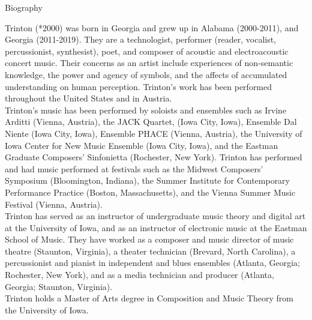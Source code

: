 \documentclass[11pt]{article}
\begin{document}
\vspace*{2\baselineskip}

\begingroup
\begin{center}
\huge Biography
\end{center}
\endgroup

\vspace*{2\baselineskip}

\begingroup
\begin{center}
Trinton (*2000) was born in Georgia and grew up in Alabama (2000-2011), and Georgia (2011-2019). They are a technologist, performer (reader, vocalist, percussionist, synthesist), poet, and composer of acoustic and electroacoustic concert music. Their concerns as an artist include experiences of non-semantic knowledge, the power and agency of symbols, and the affects of accumulated understanding on human perception. Trinton's work has been performed throughout the United States and in Austria. \\ Trinton's music has been performed by soloists and ensembles such as Irvine Arditti (Vienna, Austria), the JACK Quartet, (Iowa City, Iowa),  Ensemble Dal Niente (Iowa City, Iowa), Ensemble PHACE (Vienna, Austria), the University of Iowa Center for New Music Ensemble (Iowa City, Iowa), and the Eastman Graduate Composers' Sinfonietta (Rochester, New York). Trinton has performed and had music performed at festivals such as the Midwest Composers' Symposium (Bloomington, Indiana), the Summer Institute for Contemporary Performance Practice (Boston, Massachusetts), and the Vienna Summer Music Festival (Vienna, Austria). \\ Trinton has served as an instructor of undergraduate music theory and digital art at the University of Iowa, and as an instructor of electronic music at the Eastman School of Music. They have worked as a composer and music director of music theatre (Staunton, Virginia), a theater technician (Brevard, North Carolina), a percussionist and pianist in independent and blues ensembles (Atlanta, Georgia; Rochester, New York), and as a media technician and producer (Atlanta, Georgia; Staunton, Virginia). \\ Trinton holds a Master of Arts degree in Composition and Music Theory from the University of Iowa. 
\end{center}
\endgroup
\end{document}
